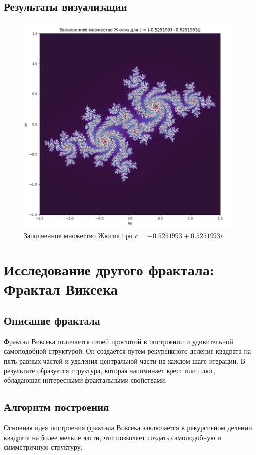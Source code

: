 \documentclass{article}
\begin{document}
	\newpage
	
	\subsection{Результаты визуализации}
	\begin{figure}[H]
		\centering
		\includegraphics[width=0.8\linewidth]{images/screenshot002}
		\caption{Заполненное множество Жюлиа при $c = -0.5251993 + 0.5251993i$}
		\label{fig:julia}
	\end{figure}
	
	\newpage
	
	\section{Исследование другого фрактала: Фрактал Виксека}
	
	\subsection{Описание фрактала}
	Фрактал Виксека отличается своей простотой в построении и удивительной самоподобной структурой. Он создаётся путем рекурсивного деления квадрата на пять равных частей и удаления центральной части на каждом шаге итерации. В результате образуется структура, которая напоминает крест или плюс, обладающая интересными фрактальными свойствами.
	
	\subsection{Алгоритм построения}
	Основная идея построения фрактала Виксека заключается в рекурсивном делении квадрата на более мелкие части, что позволяет создать самоподобную и симметричную структуру.
	
\end{document}

